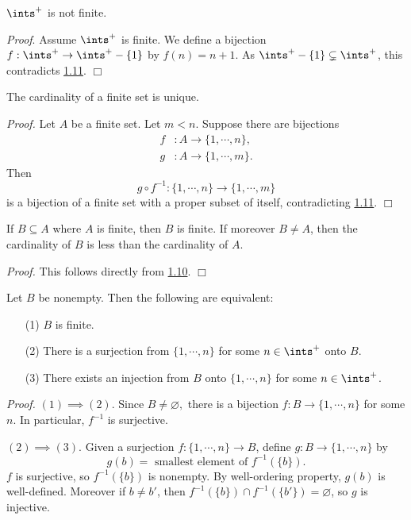 \begin{corollary}\label{1.12}
    $\ints^+$ is not finite.
\end{corollary}
{\it Proof}. Assume $\ints^+$ is finite. We define a bijection $f: \ints^+ \rightarrow \ints^+ - \{1\}$ by $f(n) = n+1$. As $\ints^+ - \{1\} \subsetneq \ints^+$, this contradicts \hyperref[1.11]{1.11}. $\Box$
\begin{corollary}\label{1.13}
    The cardinality of a finite set is unique.
\end{corollary}
{\it Proof.} Let $A$ be a finite set. Let $m< n$. Suppose there are bijections
\begin{align*}
    f&: A \rightarrow \{1, \cdots, n\}, \\
    g&: A \rightarrow \{1, \cdots, m\}.
\end{align*}
Then 
$$g \circ f^{-1}: \{1, \cdots, n\} \rightarrow \{1, \cdots, m\}$$
is a bijection of a finite set with a proper subset of itself, contradicting \hyperref[1.11]{1.11}. $\Box$
\begin{corollary}\label{1.14}
    If $B \subseteq A$ where $A$ is finite, then $B$ is finite. If moreover $B \neq A$, then the cardinality of $B$ is less than the cardinality of $A$.
\end{corollary}
{\it Proof.} This follows directly from \hyperref[1.10]{1.10}. $\Box$
\begin{corollary}\label{1.15}
    Let $B$ be nonempty. Then the following are equivalent:
    \begin{enumerate}
        \item[(1)] $B$ is finite.
        \item[(2)] There is a surjection from $\{1, \cdots, n\}$ for some $n \in \ints^+$ onto $B$.
        \item[(3)] There exists an injection from $B$ onto $\{1, \cdots, n\}$ for some $n \in \ints^+$.
    \end{enumerate}
\end{corollary}
{\it Proof.} $(1) \implies (2).$ Since $B \neq \varnothing,$ there is a bijection $f: B \rightarrow \{1, \cdots, n\}$ for some $n$. In particular, $f^{-1}$ is surjective.

$(2) \implies (3).$ Given a surjection $f: \{1, \cdots, n\} \rightarrow B$, define $g: B \rightarrow \{1, \cdots, n\}$ by
$$g(b) = \text{ smallest element of } f^{-1}(\{b\}).$$
$f$ is surjective, so $f^{-1}(\{b\})$ is nonempty. By well-ordering property, $g(b)$ is well-defined. Moreover if $b \neq b'$, then $f^{-1}(\{b\}) \cap f^{-1}(\{b'\}) = \varnothing$, so $g$ is injective.


